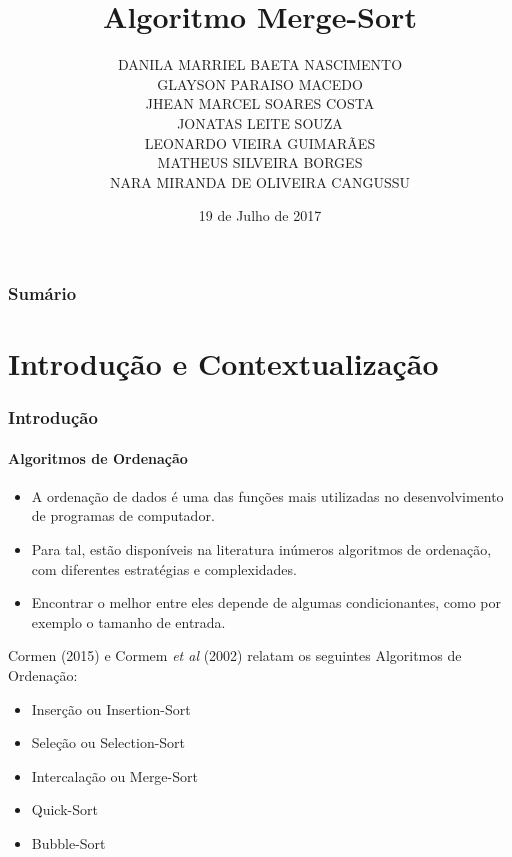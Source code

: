\documentclass[aspectratio=169]{beamer}
\begin{document}
	\title[Projeto e Análise de Algoritmo]{Algoritmo Merge-Sort}
	\author[PPGMCS]{DANILA MARRIEL BAETA NASCIMENTO\\
		GLAYSON PARAISO MACEDO	\\
		JHEAN MARCEL SOARES COSTA\\	
		JONATAS LEITE SOUZA	\\
		LEONARDO VIEIRA GUIMARÃES\\	
		MATHEUS SILVEIRA BORGES\\	
		NARA MIRANDA DE OLIVEIRA CANGUSSU}
	\date[2017]{19 de Julho de 2017}
	
	\begin{frame}
		\titlepage
	\end{frame}
	\begin{frame}
		\frametitle{Sum\'{a}rio}
		\tableofcontents%
	\end{frame}
	
	\section{Introdução e Contextualização}

	\begin{frame}
		\frametitle{Introdução}		
		\framesubtitle{Algoritmos de Ordenação}		
		\begin{itemize}
			\item A ordenação de dados é uma das funções mais utilizadas no desenvolvimento de programas de computador.
			\item Para tal, estão disponíveis na literatura inúmeros algoritmos de ordenação, com diferentes estratégias e complexidades. 
			\item Encontrar o melhor entre eles depende de algumas condicionantes, como por exemplo o tamanho de entrada.
		\end{itemize}
	
		
	\end{frame}
	\begin{frame}
	 	Cormen (2015) e Cormem \textit{et al} (2002) relatam  os seguintes Algoritmos de Ordenação:
	 	\begin{itemize}
	 		\item Inserção ou Insertion-Sort
	 		\item Seleção ou Selection-Sort
	 		\item Intercalação ou Merge-Sort
	 		\item Quick-Sort
	 		\item Bubble-Sort
	 	\end{itemize}
	\end{frame}
\end{document}
